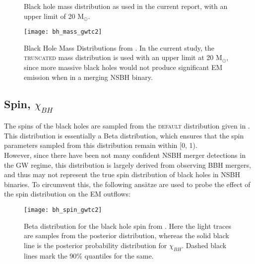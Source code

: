         \begin{figure}[H]
            \centering
            \def\svgwidth{0.8\linewidth}
            
            \caption[Black hole mass distribution with upper limit]
            {
                Black hole mass distribution as used in the current report, with an
                upper limit of 20 M$_\odot$.
            }
            \label{fig:bh_mass}
        \end{figure}

        \begin{figure}
            \centering
            \texttt{[image: bh\_mass\_gwtc2]}
            \caption[Black hole mass distributions from GWTC-2]
            {
                Black Hole Mass Distributions from \cite{abbott_2020B}. In the current
                study, the \textsc{truncated} mass distribution is used with an upper
                limit at 20 M$_\odot$, since more massive black holes would not produce
                significant EM emission when in a merging NSBH binary.
            }
            \label{fig:bh_mass_gwtc2}
        \end{figure}

    \subsection{Spin, $\chi_{BH}$}\label{sub:spin-dists}
        The spins of the black holes are sampled from the \textsc{default} distribution
        given in \cite{abbott_2020B}. This distribution is essentially a Beta
        distribution, which ensures that the spin parameters sampled from this
        distribution remain within [0, 1).\\
        However, since there have been not many confident NSBH merger detections in the
        GW regime, this distribution is largely derived from observing BBH mergers, and
        thus may not represent the true spin distribution of black holes in NSBH
        binaries.  To circumvent this, the following ans\"{a}tze are used to probe the
        effect of the spin distribution on the EM outflows:

        \begin{figure}[H]
            \centering
            \texttt{[image: bh\_spin\_gwtc2]}
            \caption[Black hole spin distribution from GWTC-2]{
                Beta distribution for the black hole spin from \cite{abbott_2020B}.
                Here the light traces are samples from the posterior distribution,
                whereas the solid black line is the posterior probability distribution
                for $\chi_{BH}$. Dashed black lines mark the 90\% quantiles for the
                same.
            }
            \label{fig:bh_spin_gwtc2}
        \end{figure}


